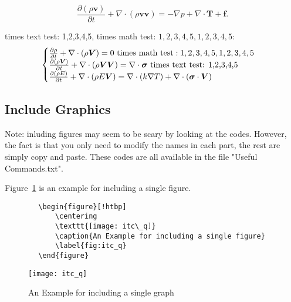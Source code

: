 \begin{equation}\label{eq:N-S_equation}
    \frac{\partial (\rho\mathbf{v})}{\partial t} + \nabla \cdot (\rho \mathbf{v} \mathbf{v}) = -\nabla p + \nabla \cdot\mathbf{T} + \mathbf{f}. 
\end{equation}    

times text test: 1,2,3,4,5, times math test: $\mathrm{1,2,3,4,5}, 1,2,3,4,5$:
\begin{equation} \label{eq:ns}
    \begin{cases}
        \frac{\partial \rho}{\partial t} + \nabla\cdot(\rho\Vector{V}) = 0 \ \mathrm{times\ math\ test: 1,2,3,4,5}, 1,2,3,4,5\\
        \frac{\partial (\rho\Vector{V})}{\partial t} + \nabla\cdot(\rho\Vector{V}\Vector{V}) = \nabla\cdot\Tensor{\sigma} \ \text{times text test: 1,2,3,4,5}\\
        \frac{\partial (\rho E)}{\partial t} + \nabla\cdot(\rho E\Vector{V}) = \nabla\cdot(k\nabla T) + \nabla\cdot(\Tensor{\sigma}\cdot\Vector{V})
    \end{cases}
\end{equation}

\subsection{Include Graphics}
Note: inluding figures may seem to be scary by looking at the codes. However, the fact is that you only need to modify the names in each part, the rest are simply copy and paste. These codes are all available in the file "Useful Commands.txt".

Figure~\ref{fig:itc_q} is an example for including a single figure.
\begin{center}
    \small
    \begin{verbatim}
        \begin{figure}[!htbp]
            \centering
            \texttt{[image: itc\_q]}
            \caption{An Example for including a single figure}
            \label{fig:itc_q}
        \end{figure}
    \end{verbatim}
\end{center}

\begin{figure}[!htbp]
    \centering
    \texttt{[image: itc\_q]}
    \caption{An Example for including a single graph}
    \label{fig:itc_q}
\end{figure}

